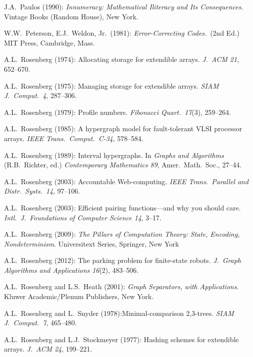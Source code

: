 \begin{thebibliography}{999}



J.A.~Paulos (1990):
{\it Innumeracy: Mathematical Iliteracy and Its Consequences.}
Vintage Books (Random House), New York.

W.W.~Peterson, E.J.~Weldon, Jr.~(1981):
{\it Error-Correcting Codes.}~(2nd Ed.)
MIT Press, Cambridge, Mass.



A.L.~Rosenberg (1974): Allocating storage for extendible arrays.  {\it
J.~ACM 21}, 652--670.

A.L.~Rosenberg (1975): Managing storage for extendible arrays.  {\it
SIAM J.~Comput.~4}, 287--306.

A.L.~Rosenberg (1979): Profile numbers.  {\it Fibonacci Quart.~17}(3),
259--264.

A.L.~Rosenberg (1985): A hypergraph model for fault-tolerant VLSI
processor arrays.  {\it IEEE Trans.~Comput.~C-34}, 578--584.

A.L.~Rosenberg (1989): Interval hypergraphs.  In {\it Graphs and
  Algorithms} (R.B.~Richter, ed.) {\it Contemporary Mathematics 89},
Amer.~Math.~Soc., 27--44.

A.L.~Rosenberg (2003): Accountable Web-computing.  {\it IEEE
Trans.~Parallel and Distr.~Systs.~14}, 97--106.

A.L.~Rosenberg (2003): Efficient pairing functions---and why you
should care.  {\it Intl.~J.~Foundations of Computer Science 14},
3--17.

A.L.~Rosenberg (2009):
{\it The Pillars of Computation Theory: State, Encoding,
  Nondeterminism}.
Universitext Series, Springer, New York 

A.L.~Rosenberg (2012): The parking problem for finite-state
robots.  {\it J.~Graph Algorithms and Applications 16}(2),
483--506.

A.L.~Rosenberg and L.S.~Heath (2001):
{\it Graph Separators, with Applications}.
Kluwer Academic/Plenum Publishers, New York.

A.L.~Rosenberg and L.~Snyder (1978):Minimal-comparison 2,3-trees.
{\it SIAM J.~Comput.~7}, 465--480.

A.L.~Rosenberg and L.J.~Stockmeyer (1977): Hashing schemes for
extendible arrays.  {\it J.~ACM 24}, 199--221.


\end{thebibliography}
